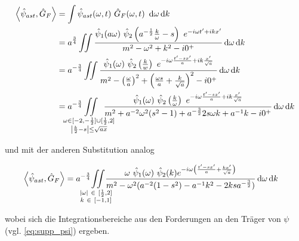 \begin{align}
\left< \hat\psi_{ast}, \hat G_F \right> &=
    \int \hat \psi_{ast}(\omega, t) ~\hat G_F(\omega, t) ~\d \omega \d k
    \nonumber \\
    &=
    a^{\frac{3}{4}} \iint \frac{
        \hat \psi_1 (a \omega)
        ~\hat \psi_2 \left(a^{-\frac{1}{2}}\frac{k}{\omega} - s\right)
        ~ e^{-i\omega t' + i k x'}
    }
    {
        m^2 - \omega^2 + k^2 - i 0^+
    }
    \d \omega \d k
    \nonumber \\
    &=
    a^{-\frac{3}{4}} \iint \frac{
        \hat\psi_1(\omega)
        ~\hat \psi_2\left(\tfrac{k}{w}\right)
        ~e^{-i \omega \frac{t' - sx'}{a} + ik \frac{x'}{\sqrt{a}}}
    }
    {
        m^2 - \left(\frac{\omega}{a}\right)^2
        + \left(\frac{\omega s}{a} + \frac{k}{\sqrt{a}}\right)^2 - i0^+
    }
    \d \omega \d k \nonumber \\
    &=
    a^{-\frac{3}{4}}
    \kern -2em \iint
    \limits_{
    \substack{
        \omega \in [-2, -\frac{1}{2}]\cup[\frac{1}{2},2] \\
        \left|\frac{k}{2}-s\right| \leq \sqrt{ax}
        }
    }
    \kern -1.5em
    \frac{
        \hat\psi_1(\omega)
        ~\hat \psi_2\left(\tfrac{k}{\omega}\right)
        ~e^{-i \omega \frac{t' - sx'}{a} + ik \frac{x'}{\sqrt{a}}}
    }
    {
        m^2 + a^{-2} \omega^2 (s^2 - 1) + a^{-\frac{3}{2}} 2 s \omega k + a^{-1} k  - i0^+
    }
    \d \omega \d k
    \label{eq:psi_ast_gf_1}
\end{align}


und mit der anderen Substitution analog

\begin{align}
    \left< \hat\psi_{ast}, \hat G_F \right>
    &=
    a^{-\frac{3}{4}}
    \kern -1em
    \iint \limits_{\substack{
        |\omega|~ \in~ [\frac{1}{2},2] \\
        k ~\in~ [-1,1]
        }
    }
    \kern -1em
    \frac{
        \omega ~\hat \psi_1(\omega) ~\hat \psi_2(k)
        e^{-i \omega \left(\frac{t' - sx'}{a} + \frac{kx'}{\sqrt{a}}\right)}
    }
    {
        m^2 - \omega^2(a^{-2}(1-s^2)-a^{-1}k^2 - 2 k s a^{-\frac{3}{2}})
    }
    \d \omega \d k
    \label{eq:psi_ast_gf_2}
\end{align}

wobei sich die Integrationsbereiche aus den Forderungen an den Träger von $\psi$
(vgl. \eqref{eq:supp_psi}) ergeben.




